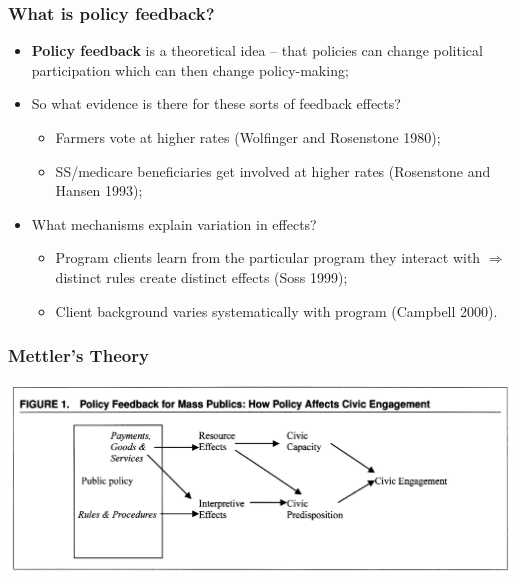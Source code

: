 \documentclass[aspectratio=169]{beamer}
\theoremstyle{principle}
\begin{document}
\begin{frame}
\frametitle{What is policy feedback?}
\begin{itemize}
\item \textbf{Policy feedback} is a theoretical idea -- that policies can change political participation which can then change policy-making;
\bigskip
\bigskip
\item So what evidence is there for these sorts of feedback effects?
\begin{itemize}
\item Farmers vote at higher rates (Wolfinger and Rosenstone 1980);
\item SS/medicare beneficiaries get involved at higher rates (Rosenstone and Hansen 1993);
\end{itemize}
\bigskip
\bigskip
\item What mechanisms explain variation in effects?
\begin{itemize}
\item Program clients learn from the particular program they interact with $\Rightarrow$ distinct rules create distinct effects (Soss 1999);
\item Client background varies systematically with program (Campbell 2000).
\end{itemize}
\end{itemize}
\end{frame}

\begin{frame}
\frametitle{Mettler's Theory}

\begin{center}
\includegraphics[scale=0.45]{Mettlers_theory.png}
\end{center}

\end{frame}
\end{document}
